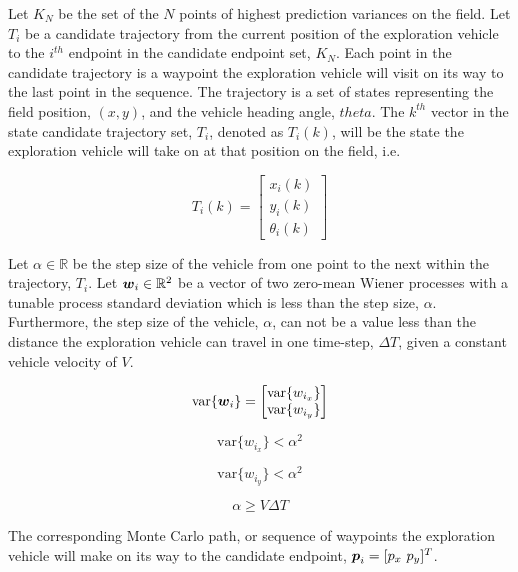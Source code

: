Let $K_N$ be the set of the $N$ points of highest prediction variances on the field. Let $T_i$ be a candidate trajectory from the current position of the exploration vehicle to the $i^{th}$ endpoint in the candidate endpoint set, $K_N$. Each point in the candidate trajectory is a waypoint the exploration vehicle will visit on its way to the last point in the sequence. The trajectory is a set of states representing the field position, $(x,y)$, and the vehicle heading angle, $theta$. The $k^{th}$ vector in the state candidate trajectory set, $T_i$, denoted as $T_{i}(k)$, will be the state the exploration vehicle will take on at that position on the field, i.e.

\begin{equation}
T_{i}(k) = \begin{bmatrix} x_i(k) \\ y_i(k) \\ \theta_i(k) \end{bmatrix}
\end{equation}

Let $\alpha \in \mathbb{R}$ be the step size of the vehicle from one point to the next within the trajectory, $T_i$. Let ${\it{\boldsymbol{w}}}_i \in \mathbb{R}^2$ be a vector of two zero-mean Wiener processes with a tunable process standard deviation which is less than the step size, $\alpha$. Furthermore, the step size of the vehicle, $\alpha$, can not be a value less than the distance the exploration vehicle can travel in one time-step, $\Delta T$, given a constant vehicle velocity of $V$.

\begin{equation}
\text{var}\{{\it{\boldsymbol{w}}}_i\} = \begin{bmatrix} \text{var}\{w_{i_x}\} \\ \text{var}\{w_{i_y}\} \end{bmatrix}
\end{equation}

\begin{equation}
\text{var}\{w_{i_x}\} < \alpha^2
\end{equation}

\begin{equation}
\text{var}\{w_{i_y}\} < \alpha^2
\end{equation}

\begin{equation}
\alpha \geq V \Delta T
\end{equation}

The corresponding Monte Carlo path, or sequence of waypoints the exploration vehicle will make on its way to the candidate endpoint, ${\it{\boldsymbol{p}}}_i = [p_x\ p_y]^T$.

